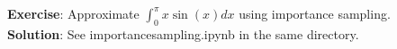 \documentclass{article}
\begin{document}
\par

\textbf{Exercise}: Approximate $\int_0^\pi x \sin(x) dx$ using importance sampling. 
\\[2ex]
\textbf{Solution}: See importancesampling.ipynb in the same directory. 












\end{document}
